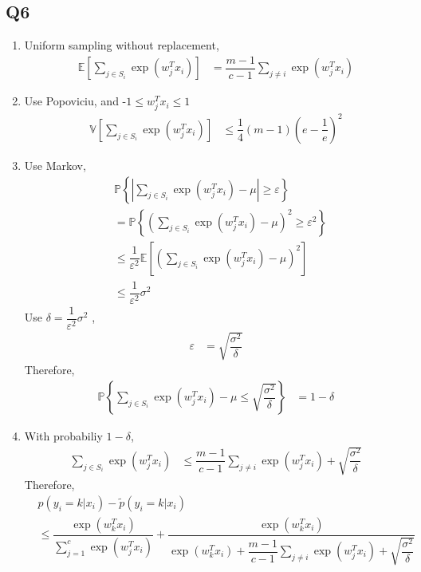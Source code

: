 \documentclass{article}
\begin{document}
\subsection{Q6}
\begin{enumerate}
\item Uniform sampling without replacement,
\begin{align*}
\mathbb{E}\left[\displaystyle\sum_{j \in S_{i}} \exp\left(w_{j}^{T} x_{i}\right)\right] &= \dfrac{m-1}{c-1} \displaystyle\sum_{j \neq  i} \exp\left(w_{j}^{T} x_{i}\right)
\end{align*}
\item Use Popoviciu, and -$1 \leq  w_{j}^{T} x_{i} \leq  1$
\begin{align*}
\mathbb{V}\left[\displaystyle\sum_{j \in S_{i}} \exp\left(w_{j}^{T} x_{i}\right)\right] &\leq  \dfrac{1}{4} \left(m - 1\right)\left(e - \dfrac{1}{e}\right)^{2}
\end{align*}
\item Use Markov,
\begin{align*}
&  \mathbb{P}\left\{| \displaystyle\sum_{j \in S_{i}} \exp\left(w_{j}^{T} x_{i}\right) - \mu | \geq  \varepsilon\right\}
\\ &= \mathbb{P}\left\{\left(\displaystyle\sum_{j \in S_{i}} \exp\left(w_{j}^{T} x_{i}\right) - \mu\right)^{2} \geq  \varepsilon^{2}\right\}
\\ &\leq  \dfrac{1}{\varepsilon^{2}} \mathbb{E}\left[\left(\displaystyle\sum_{j \in S_{i}} \exp\left(w_{j}^{T} x_{i}\right) - \mu\right)^{2}\right]
\\ &\leq  \dfrac{1}{\varepsilon^{2}} \sigma^{2}
\end{align*}
Use $\delta = \dfrac{1}{\varepsilon^{2}} \sigma^{2}$ ,
\begin{align*}
\varepsilon &= \sqrt{\dfrac{\sigma^{2}}{\delta}}
\end{align*}
Therefore,
\begin{align*}
\mathbb{P}\left\{ \displaystyle\sum_{j \in S_{i}} \exp\left(w_{j}^{T} x_{i}\right) - \mu \leq  \sqrt{\dfrac{\sigma^{2}}{\delta}}\right\} &= 1 - \delta
\end{align*}
\item With probabiliy $1 - \delta$,
\begin{align*}
\displaystyle\sum_{j \in S_{i}} \exp\left(w_{j}^{T} x_{i}\right) &\leq  \dfrac{m-1}{c-1} \displaystyle\sum_{j \neq  i} \exp\left(w_{j}^{T} x_{i}\right) + \sqrt{\dfrac{\sigma^{2}}{\delta}}
\end{align*}
Therefore,
\begin{align*}
&  p\left(y_{i} = k | x_{i}\right)  - \tilde{p} \left(y_{i} = k | x_{i}\right)
\\ &\leq  \dfrac{\exp\left(w_{k}^{T} x_{i}\right)}{\displaystyle\sum_{j=1}^{c} \exp\left(w_{j}^{T} x_{i}\right)} + \dfrac{\exp\left(w_{k}^{T} x_{i}\right)}{\exp\left(w_{k}^{T} x_{i}\right) + \dfrac{m-1}{c-1} \displaystyle\sum_{j \neq  i} \exp\left(w_{j}^{T} x_{i}\right) + \sqrt{\dfrac{\sigma^{2}}{\delta}}}
\end{align*}
\end{enumerate}
\end{document}
